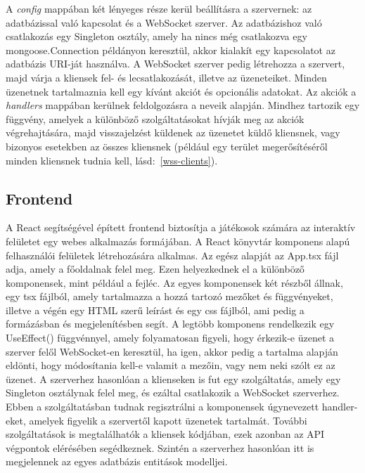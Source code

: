\documentclass[
]{thesis-ekf}
\theoremstyle{definition}
\theoremstyle{remark}
\begin{document}
	A \emph{config} mappában két lényeges része kerül beállításra a szervernek: az adatbázissal való kapcsolat és a WebSocket szerver. Az adatbázishoz való csatlakozás egy Singleton osztály, amely ha nincs még csatlakozva egy mongoose.Connection példányon keresztül, akkor kialakít egy kapcsolatot az adatbázis URI-ját használva. A WebSocket szerver pedig létrehozza a szervert, majd várja a kliensek fel- és lecsatlakozását, illetve az üzeneteiket. Minden üzenetnek tartalmaznia kell egy kívánt akciót és opcionális adatokat. Az akciók a \emph{handlers} mappában kerülnek feldolgozásra a neveik alapján. Mindhez tartozik egy függvény, amelyek a különböző szolgáltatásokat hívják meg az akciók végrehajtására, majd visszajelzést küldenek az üzenetet küldő kliensnek, vagy bizonyos esetekben az összes kliensnek (például egy terület megerősítéséről minden kliensnek tudnia kell, lásd:~\ref{wss-clients}).
	
	 
	
	\subsection{Frontend}
	
	A React segítségével épített frontend biztosítja a játékosok számára az interaktív felületet egy webes alkalmazás formájában. A React könyvtár komponens alapú felhasználói felületek létrehozására alkalmas. Az egész alapját az App.tsx fájl adja, amely a főoldalnak felel meg. Ezen helyezkednek el a különböző komponensek, mint például a fejléc. Az egyes komponensek két részből állnak, egy tsx fájlból, amely tartalmazza a hozzá tartozó mezőket és függvényeket, illetve a végén egy HTML szerű leírást és egy css fájlból, ami pedig a formázásban és megjelenítésben segít. A legtöbb komponens rendelkezik egy UseEffect() függvénnyel, amely folyamatosan figyeli, hogy érkezik-e üzenet a szerver felől WebSocket-en keresztül, ha igen, akkor pedig a tartalma alapján eldönti, hogy módosítania kell-e valamit a mezőin, vagy nem neki szólt ez az üzenet. A szerverhez hasonlóan a klienseken is fut egy szolgáltatás, amely egy Singleton osztálynak felel meg, és ezáltal csatlakozik a WebSocket szerverhez. Ebben a szolgáltatásban tudnak regisztrálni a komponensek úgynevezett handler-eket, amelyek figyelik a szervertől kapott üzenetek tartalmát. További szolgáltatások is megtalálhatók a kliensek kódjában, ezek azonban az API végpontok elérésében segédkeznek. Szintén a szerverhez hasonlóan itt is megjelennek az egyes adatbázis entitások modelljei. 
	
\end{document}
